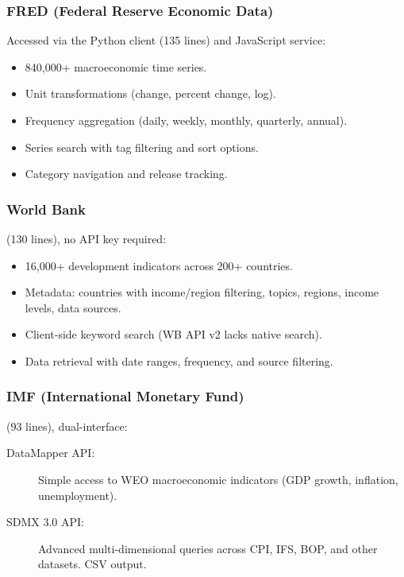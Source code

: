 \subsubsection{FRED (Federal Reserve Economic Data)}

Accessed via the Python client  (135 lines) and JavaScript service:

\begin{itemize}
  \item 840,000+ macroeconomic time series.
  \item Unit transformations (change, percent change, log).
  \item Frequency aggregation (daily, weekly, monthly, quarterly, annual).
  \item Series search with tag filtering and sort options.
  \item Category navigation and release tracking.
\end{itemize}

\subsubsection{World Bank}

 (130 lines), no API key required:

\begin{itemize}
  \item 16,000+ development indicators across 200+ countries.
  \item Metadata: countries with income/region filtering, topics, regions, income levels, data sources.
  \item Client-side keyword search (WB API v2 lacks native search).
  \item Data retrieval with date ranges, frequency, and source filtering.
\end{itemize}

\subsubsection{IMF (International Monetary Fund)}

 (93 lines), dual-interface:

\begin{description}
  \item[DataMapper API:] Simple access to WEO macroeconomic indicators (GDP growth, inflation, unemployment).
  \item[SDMX 3.0 API:] Advanced multi-dimensional queries across CPI, IFS, BOP, and other datasets. CSV output.
\end{description}

